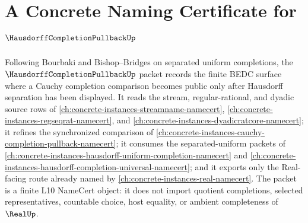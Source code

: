 \chapter{A Concrete Naming Certificate for $\HausdorffCompletionPullbackUp$}
\label{ch:concrete-instances-hausdorff-completion-pullback-namecert}

Following Bourbaki and Bishop--Bridges on separated uniform completions, the $\HausdorffCompletionPullbackUp$ packet records the finite BEDC surface where a Cauchy completion comparison becomes public only after Hausdorff separation has been displayed. It reads the stream, regular-rational, and dyadic source rows of \autoref{ch:concrete-instances-streamname-namecert}, \autoref{ch:concrete-instances-regseqrat-namecert}, and \autoref{ch:concrete-instances-dyadicratcore-namecert}; it refines the synchronized comparison of \autoref{ch:concrete-instances-cauchy-completion-pullback-namecert}; it consumes the separated-uniform packets of \autoref{ch:concrete-instances-hausdorff-uniform-completion-namecert} and \autoref{ch:concrete-instances-hausdorff-completion-universal-namecert}; and it exports only the Real-facing route already named by \autoref{ch:concrete-instances-real-namecert}. The packet is a finite L10 NameCert object: it does not import quotient completions, selected representatives, countable choice, host equality, or ambient completeness of $\RealUp$.

